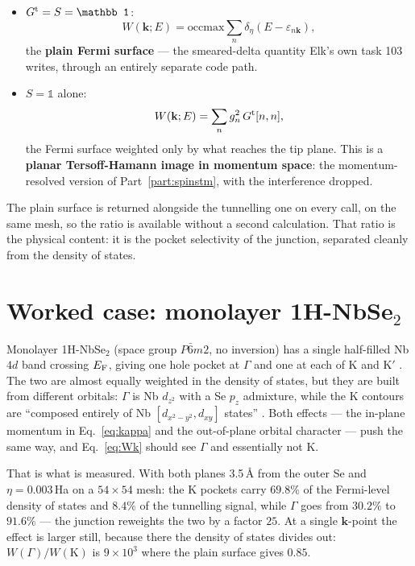 \documentclass[11pt]{article}
\begin{document}
\begin{itemize}
\item $G^{\rm t}=S=\mathbb 1$:
  \begin{equation}
    W(\mathbf k;E)=\mathrm{occmax}\sum_n\delta_\eta(E-\varepsilon_{n\mathbf k}),
  \end{equation}
  the \textbf{plain Fermi surface} --- the smeared-delta quantity Elk's own
  task 103 writes, through an entirely separate code path.
\item $S=\mathbb 1$ alone:
  \begin{equation}
    W(\mathbf k;E)=\sum_n g_n^2\,G^{\rm t}[n,n],
  \end{equation}
  the Fermi surface weighted only by what reaches the tip plane. This is a
  \textbf{planar Tersoff-Hamann image in momentum space}: the momentum-resolved
  version of Part~\ref{part:spinstm}, with the interference dropped.
\end{itemize}

The plain surface is returned alongside the tunnelling one on every call, on
the same mesh, so the ratio is available without a second calculation. That
ratio is the physical content: it is the pocket selectivity of the junction,
separated cleanly from the density of states.

\section{Worked case: monolayer 1H-NbSe$_2$}

Monolayer 1H-NbSe$_2$ (space group $P\bar6m2$, no inversion) has a single
half-filled Nb $4d$ band crossing $E_{\rm F}$, giving one hole pocket at
$\Gamma$ and one at each of K and K$'$ \cite{SilvaGuillen2016,Nakata2018}.
The two are almost equally weighted in the density of states, but they are
built from different orbitals: $\Gamma$ is Nb $d_{z^2}$ with a Se $p_z$
admixture, while the K contours are ``composed entirely of Nb
$[d_{x^2-y^2},d_{xy}]$ states'' \cite{Wickramaratne2020}. Both effects ---
the in-plane momentum in Eq.~\eqref{eq:kappa} and the out-of-plane orbital
character --- push the same way, and Eq.~\eqref{eq:Wk} should see $\Gamma$ and
essentially not K.

That is what is measured. With both planes 3.5\,\AA{} from the outer Se and
$\eta=0.003$\,Ha on a $54\times54$ mesh: the K pockets carry $69.8\%$ of the
Fermi-level density of states and $8.4\%$ of the tunnelling signal, while
$\Gamma$ goes from $30.2\%$ to $91.6\%$ --- the junction reweights the two by
a factor $25$. At a single $\mathbf k$-point the effect is larger still,
because there the density of states divides out: $W(\Gamma)/W(\mathrm K)$ is
$9\times10^3$ where the plain surface gives $0.85$.
\end{document}
